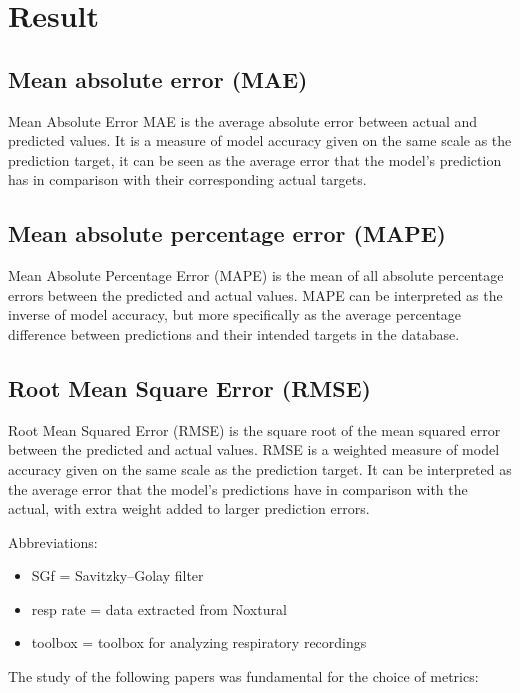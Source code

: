\chapter{Result}

\section{Mean absolute error (MAE)}
Mean Absolute Error MAE is the average absolute error between actual and predicted values.  It is a measure of model accuracy given on the same scale as the prediction target, it can be seen as the average error that the model's prediction has in comparison with their corresponding actual targets.


\section {Mean absolute percentage error (MAPE)} 
Mean Absolute Percentage Error (MAPE) is the mean of all absolute percentage errors between the predicted and actual values.
MAPE can be interpreted as the inverse of model accuracy, but more specifically as the average percentage difference between predictions and their intended targets in the database.


 \section{Root Mean Square Error (RMSE) }
 Root Mean Squared Error (RMSE) is the square root of the mean squared error between the predicted and actual values.
 RMSE is a weighted measure of model accuracy given on the same scale as the prediction target. It can be interpreted as the average error that the model’s predictions have in comparison with the actual, with extra weight added to larger prediction errors.
 
 Abbreviations:
\begin{itemize}
    \item SGf = Savitzky–Golay filter
    \item resp rate = data extracted from Noxtural
    \item toolbox = toolbox for analyzing respiratory recordings \cite{Noto2018AutomatedToolbox}
\end{itemize}

The study of the following papers was fundamental for the choice of metrics:
    \cite{Hunt2015IdentificationExercise} \cite{HoogAntink2020BallistocardiographyIntervention} 
    \cite{SadekAStudy}
    
